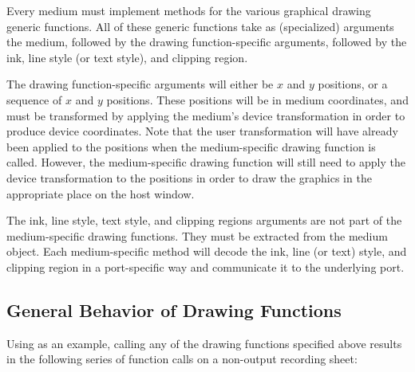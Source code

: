 Every medium must implement methods for the various graphical drawing generic
functions.  All of these generic functions take as (specialized) arguments the
medium, followed by the drawing function-specific arguments, followed by the
ink, line style (or text style), and clipping region.

The drawing function-specific arguments will either be $x$ and $y$ positions,
or a sequence of $x$ and $y$ positions.  These positions will be in medium
coordinates, and must be transformed by applying the medium's device
transformation in order to produce device coordinates.  Note that the user
transformation will have already been applied to the positions when the
medium-specific drawing function is called.  However, the medium-specific
drawing function will still need to apply the device transformation to the
positions in order to draw the graphics in the appropriate place on the host
window.

The ink, line style, text style, and clipping regions arguments are not part of
the medium-specific drawing functions.  They must be extracted from the medium
object.  Each medium-specific method will decode the ink, line (or text) style,
and clipping region in a port-specific way and communicate it to the underlying
port.


\subsection {General Behavior of Drawing Functions}

Using  as an example, calling any of the drawing functions
specified above results in the following series of function calls on a
non-output recording sheet:

